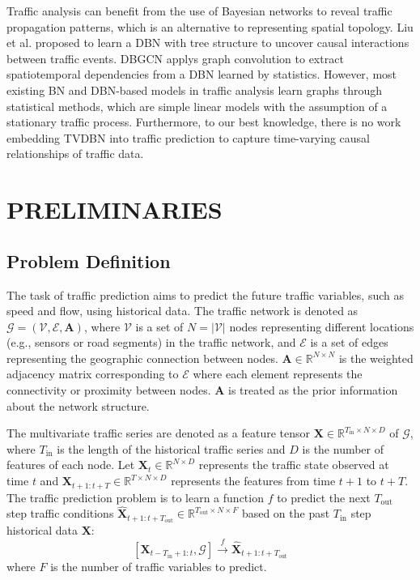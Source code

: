 \documentclass[letterpaper, 10 pt, conference]{ieeeconf}
\begin{document}
Traffic analysis can benefit from the use of Bayesian networks to reveal traffic propagation patterns, which is an alternative to representing spatial topology. Liu et al.\cite{liu2011discovering} proposed to learn a DBN with tree structure to uncover causal interactions between traffic events. DBGCN \cite{luan2022traffic} applys graph convolution to extract spatiotemporal dependencies from a DBN learned by statistics. However, most existing BN and DBN-based models in traffic analysis learn graphs through statistical methods, which are simple linear models with the assumption of a stationary traffic process. Furthermore, to our best knowledge, there is no work embedding TVDBN into traffic prediction to capture time-varying causal relationships of traffic data. 

\section{PRELIMINARIES}


\subsection{Problem Definition}

The task of traffic prediction aims to predict the future traffic variables, such as speed and flow, using historical data. The traffic network is denoted as $\mathcal{G}=(\mathcal{V}, \mathcal{E}, \mathbf{A})$, where $\mathcal{V}$ is a set of $N=|\mathcal{V}|$ nodes representing different locations (e.g., sensors or road segments) in the traffic network, and $\mathcal{E}$ is a set of edges representing the geographic connection between nodes. $\mathbf{A}\in \mathbb{R}^{N\times N}$ is the weighted adjacency matrix corresponding to $\mathcal{E}$ where each element represents the connectivity or proximity between nodes. $\mathbf{A}$ is treated as the prior information about the network structure.

The multivariate traffic series are denoted as a feature tensor $\mathbf{X}\in\mathbb{R}^{T_{\text{in}}\times N\times D}$ of $\mathcal{G}$, where $T_{\text{in}}$ is the length of the historical traffic series and $D$ is the number of features of each node. Let $\mathbf{X}_t\in\mathbb{R}^{N\times D}$ represents the traffic state observed at time $t$ and $\mathbf{X}_{t+1:t+T}\in\mathbb{R}^{T\times N\times D}$ represents the features from time $t+1$ to $t+T$. The traffic prediction problem is to learn a function $f$ to predict the next $T_{\text{out}}$ step traffic conditions $\hat{\mathbf{X}}_{t+1:t+T_\text{out}} \in \mathbb{R}^{T_\text{out}\times N\times F}$  based on the past $T_{\text{in}}$ step historical data $\mathbf{X}$:
\begin{equation}
        \left[\mathbf{X}_{t-T_{\text{in}}+1: t},\mathcal{G}\right] \stackrel{f}{\rightarrow} \hat{\mathbf{X}}_{t+1:t+T_{\text{out}}}   
\end{equation}
where $F$ is the number of traffic variables to predict.
\end{document}
